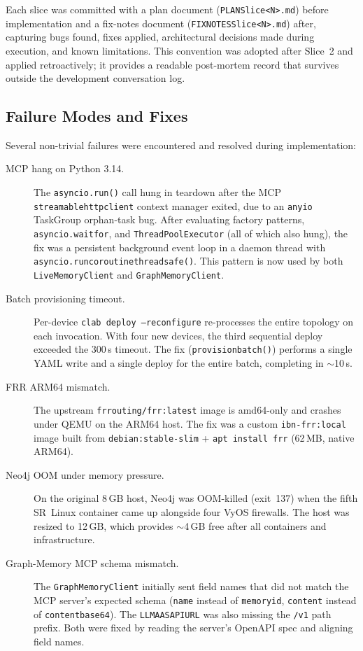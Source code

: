 \documentclass[acmtog]{acmart}
\renewcommand\_{\textunderscore\allowbreak}
\begin{document}
Each slice was committed with a plan document
(\texttt{PLAN\_Slice<N>.md}) before implementation and a fix-notes
document (\texttt{FIX\_NOTES\_Slice<N>.md}) after, capturing bugs
found, fixes applied, architectural decisions made during execution,
and known limitations. This convention was adopted after Slice~2 and
applied retroactively; it provides a readable post-mortem record
that survives outside the development conversation log.


\subsection{Failure Modes and Fixes}\label{sec:impl:failures}

Several non-trivial failures were encountered and resolved during
implementation:

\begin{description}
  \item[MCP hang on Python 3.14.]
    The \texttt{asyncio.run()} call hung in teardown after the MCP
    \texttt{streamablehttp\_client} context manager exited, due to
    an \texttt{anyio} TaskGroup orphan-task bug. After evaluating
    factory patterns, \texttt{asyncio.wait\_for}, and
    \texttt{ThreadPoolExecutor} (all of which also hung), the fix was
    a persistent background event loop in a daemon thread with
    \texttt{asyncio.run\_coroutine\_threadsafe()}. This pattern is
    now used by both \texttt{LiveMemoryClient} and
    \texttt{GraphMemoryClient}.

  \item[Batch provisioning timeout.]
    Per-device \texttt{clab deploy --reconfigure} re-processes the
    entire topology on each invocation. With four new devices, the
    third sequential deploy exceeded the 300\,s timeout. The fix
    (\texttt{provision\_batch()}) performs a single YAML write and
    a single deploy for the entire batch, completing in $\sim$10\,s.

  \item[FRR ARM64 mismatch.]
    The upstream \texttt{frrouting/frr:latest} image is amd64-only
    and crashes under QEMU on the ARM64 host. The fix was a custom
    \texttt{ibn-frr:local} image built from
    \texttt{debian:stable-slim} + \texttt{apt install frr}
    (62\,MB, native ARM64).

  \item[Neo4j OOM under memory pressure.]
    On the original 8\,GB host, Neo4j was OOM-killed (exit~137)
    when the fifth SR~Linux container came up alongside four VyOS
    firewalls. The host was resized to 12\,GB, which provides
    $\sim$4\,GB free after all containers and infrastructure.

  \item[Graph-Memory MCP schema mismatch.]
    The \texttt{GraphMemoryClient} initially sent field names that
    did not match the MCP server's expected schema (\texttt{name}
    instead of \texttt{memory\_id}, \texttt{content} instead of
    \texttt{content\_base64}). The \texttt{LLMAAS\_API\_URL} was
    also missing the \texttt{/v1} path prefix. Both were fixed by
    reading the server's OpenAPI spec and aligning field names.
\end{description}
\end{document}
